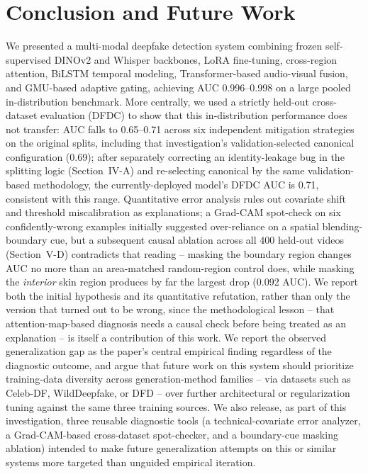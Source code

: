 \documentclass[conference]{IEEEtran}
\begin{document}
\section{Conclusion and Future Work}
We presented a multi-modal deepfake detection system combining frozen
self-supervised DINOv2 and Whisper backbones, LoRA fine-tuning,
cross-region attention, BiLSTM temporal modeling, Transformer-based
audio-visual fusion, and GMU-based adaptive gating, achieving AUC
0.996--0.998 on a large pooled in-distribution benchmark. More centrally,
we used a strictly held-out cross-dataset evaluation (DFDC) to show that
this in-distribution performance does not transfer: AUC falls to
0.65--0.71 across six independent mitigation strategies on the original
splits, including that investigation's validation-selected canonical
configuration (0.69); after separately correcting an identity-leakage bug
in the splitting logic (Section~IV-A) and re-selecting canonical by the same
validation-based methodology, the currently-deployed model's DFDC AUC is
0.71, consistent with this range. Quantitative error
analysis rules out covariate shift and threshold miscalibration as
explanations; a Grad-CAM spot-check on six confidently-wrong examples
initially suggested over-reliance on a spatial blending-boundary cue, but a
subsequent causal ablation across all 400 held-out videos
(Section~V-D) contradicts that reading -- masking the boundary region
changes AUC no more than an area-matched random-region control does, while
masking the \emph{interior} skin region produces by far the largest drop
(0.092 AUC). We report both the initial hypothesis and its quantitative
refutation, rather than only the version that turned out to be wrong, since
the methodological lesson -- that attention-map-based diagnosis needs a
causal check before being treated as an explanation -- is itself a
contribution of this work. We report the observed generalization gap as
the paper's central empirical finding regardless of the diagnostic outcome,
and argue that future work on this system should prioritize training-data
diversity across generation-method
families -- via datasets such as Celeb-DF, WildDeepfake, or DFD -- over
further architectural or regularization tuning against the same three
training sources. We also release, as part of this investigation, three
reusable diagnostic tools (a technical-covariate error analyzer, a
Grad-CAM-based cross-dataset spot-checker, and a boundary-cue masking
ablation) intended to make future
generalization attempts on this or similar systems more targeted than
unguided empirical iteration.
\end{document}
